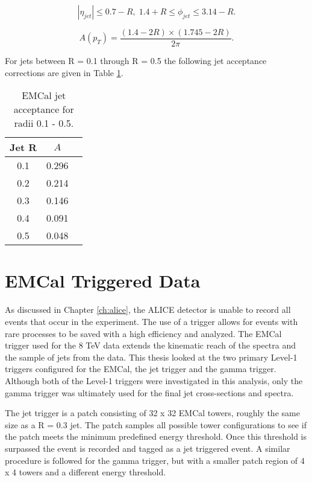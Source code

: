 \begin{equation}
|\eta_{jet}| \leq 0.7 - R, \; 1.4 + R \leq \phi_{jet} \leq 3.14 -R.
\label{eq:jetconstration}
\end{equation}

\begin{equation}
A(p_{T}) = \frac{(1.4 - 2R) \times (1.745 - 2R)}{2 \pi}.
\label{eq:acceptance}
\end{equation}

For jets between R = 0.1 through R = 0.5 the following jet acceptance corrections are given in Table \ref{tab:AcceptanceFactor}.

\begin{table}[hb]

\begin{center}
\caption{EMCal jet acceptance for radii 0.1 - 0.5.}
\begin{tabular}[b]{|c|c|c|}
	\hline
	Jet R & $ A $ \\ \hline
	0.1 & 0.296 \\ \hline
	0.2 & 0.214\\ \hline
	0.3 & 0.146\\ \hline
	0.4 & 0.091\\ \hline
	0.5 & 0.048\\ \hline
\end{tabular}
\label{tab:AcceptanceFactor}
\end{center}

\end{table}

\section{EMCal Triggered Data}

As discussed in Chapter \ref{ch:alice}, the ALICE detector is unable to record all events that occur in the experiment.   The use of a trigger allows for events with rare processes to be saved with a high efficiency and analyzed.  The EMCal trigger used for the 8 TeV data extends the kinematic reach of the spectra and the sample of jets from the data.  This thesis looked at the two primary Level-1 triggers configured for the EMCal, the jet trigger and the gamma trigger\cite{Bourrion:2010js}.  Although both of the Level-1 triggers were investigated in this analysis, only the gamma trigger was ultimately used for the final jet cross-sections and spectra.  

The jet trigger is a patch consisting of 32 x 32 EMCal towers, roughly the same size as a R = 0.3 jet.  The patch samples all possible tower configurations to see if the patch meets the minimum predefined energy threshold.  Once this threshold is surpassed the event is recorded and tagged as a jet triggered event.  A similar procedure is followed for the gamma trigger, but with a smaller patch region of 4 x 4 towers and a different energy threshold.  


